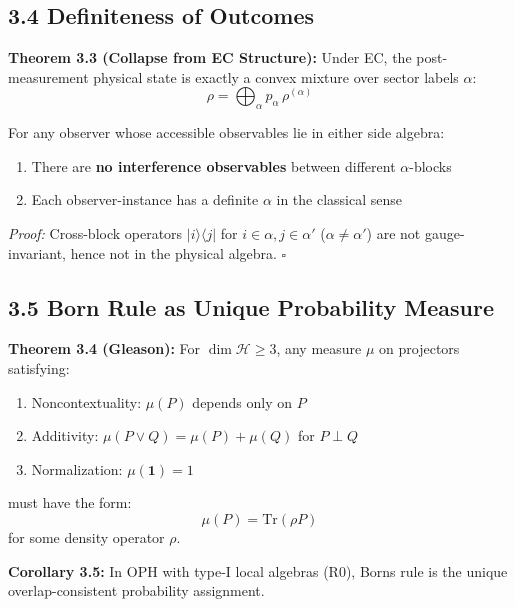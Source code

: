\subsection{3.4 Definiteness of Outcomes}\label{34-definiteness-of-outcomes}

\textbf{Theorem 3.3 (Collapse from EC Structure):} Under EC, the post-measurement physical state is exactly a convex mixture over sector labels \(\alpha\): \[\rho = \bigoplus_\alpha p_\alpha \, \rho^{(\alpha)}\]

For any observer whose accessible observables lie in either side algebra:

\begin{enumerate}
\def\labelenumi{\arabic{enumi}.}
\tightlist
\item
  There are \textbf{no interference observables} between different \(\alpha\)-blocks
\item
  Each observer-instance has a definite \(\alpha\) in the classical sense
\end{enumerate}

\emph{Proof:} Cross-block operators \(|i\rangle\langle j|\) for \(i \in \alpha, j \in \alpha'\) (\(\alpha \neq \alpha'\)) are not gauge-invariant, hence not in the physical algebra. \(\square\)

\subsection{3.5 Born Rule as Unique Probability Measure}\label{35-born-rule-as-unique-probability-measure}

\textbf{Theorem 3.4 (Gleason):} For \(\dim \mathcal{H} \geq 3\), any measure \(\mu\) on projectors satisfying:

\begin{enumerate}
\def\labelenumi{\arabic{enumi}.}
\tightlist
\item
  Noncontextuality: \(\mu(P)\) depends only on \(P\)
\item
  Additivity: \(\mu(P \vee Q) = \mu(P) + \mu(Q)\) for \(P \perp Q\)
\item
  Normalization: \(\mu(\mathbf{1}) = 1\)
\end{enumerate}

must have the form: \[\mu(P) = \text{Tr}(\rho P)\] for some density operator \(\rho\).

\textbf{Corollary 3.5:} In OPH with type-I local algebras (R0), Born\textquotesingle s rule is the unique overlap-consistent probability assignment.


